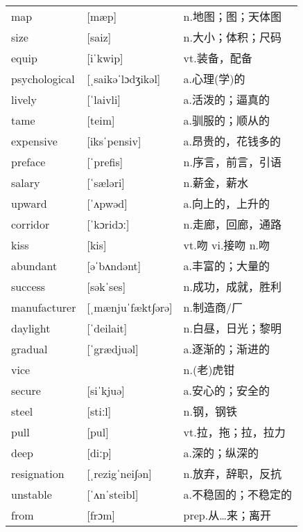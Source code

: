 \documentclass[a4paper]{article}
\begin{document}
\section{}
\begin{tabular}{l l l}

map & [mæp] & n.地图；图；天体图 \\
size & [saiz] & n.大小；体积；尺码 \\
equip & [iˈkwip] & vt.装备，配备 \\
psychological & [ˌsaikəˈlɔdʒikəl] & a.心理(学)的 \\
lively & [ˈlaivli] & a.活泼的；逼真的 \\
tame & [teim] & a.驯服的；顺从的 \\
expensive & [iksˈpensiv] & a.昂贵的，花钱多的 \\
preface & [ˈprefis] & n.序言，前言，引语 \\
salary & [ˈsæləri] & n.薪金，薪水 \\
upward & [ˈʌpwəd] & a.向上的，上升的 \\
corridor & [ˈkɔridɔː] & n.走廊，回廊，通路 \\
kiss & [kis] & vt.吻 vi.接吻 n.吻 \\
abundant & [əˈbʌndənt] & a.丰富的；大量的 \\
success & [səkˈses] & n.成功，成就，胜利 \\
manufacturer & [ˌmænjuˈfækt∫ərə] & n.制造商/厂 \\
daylight & [ˈdeilait] & n.白昼，日光；黎明 \\
gradual & [ˈgrædjuəl] & a.逐渐的；渐进的 \\
vice &  & n.(老)虎钳 \\
secure & [siˈkjuə] & a.安心的；安全的 \\
steel & [stiːl] & n.钢，钢铁 \\
pull & [pul] & vt.拉，拖；拉，拉力 \\
deep & [diːp] & a.深的；纵深的 \\
resignation & [ˌrezigˈnei∫ən] & n.放弃，辞职，反抗 \\
unstable & [ˈʌnˈsteibl] & a.不稳固的；不稳定的 \\
from & [frɔm] & prep.从…来；离开 \\

\end{tabular}
\end{document}
